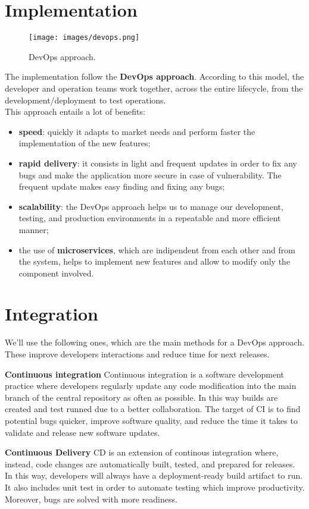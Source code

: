 \section{Implementation}

\begin{figure}[H]
  \label{fig:devops}
  \centering
  \texttt{[image: images/devops.png]}
  \caption{DevOps approach.}
\end{figure}

The implementation follow the \textbf{DevOps approach}.
According to this model, the developer and operation teams work together, across the entire lifecycle, from the development/deployment to test operations.\\
This approach entails a lot of benefits:
\begin{itemize}
\item \textbf{speed}: quickly it adapts to market needs and perform faster the implementation of the new features; 
\item \textbf{rapid delivery}: it consists in light and frequent updates in order to fix any bugs and make the application more secure in case of vulnerability.
The frequent update makes easy finding and fixing any bugs;
\item \textbf{scalability}: the DevOps approach helps us to manage our development, testing, and production environments in a repeatable and more efficient manner;
\item the use of \textbf{microservices}, which are indipendent from each other and from the system, helps to implement new features and allow to modify only the component involved.
\end{itemize}



\section{Integration}
We'll use the following ones, which are the main methods for a DevOps approach. These improve developers interactions and reduce time for next releases.
\bigskip

\textbf{Continuous integration}
Continuous integration is a software development practice where developers regularly update any code modification into the main branch of the central repository as often as possible. In this way builds are created and test runned due to a better collaboration. The target of CI is to find potential bugs quicker, improve software quality, and reduce the time it takes to validate and release new software updates.
\par
\textbf{Continuous Delivery} 
CD is an extension of continous integration where, instead, code changes are automatically built, tested, and prepared for releases. In this way, developers will always have a deployment-ready build artifact to run. It also includes unit test in order to automate testing which improve productivity. Moreover, bugs are solved with more readiness.
\par

